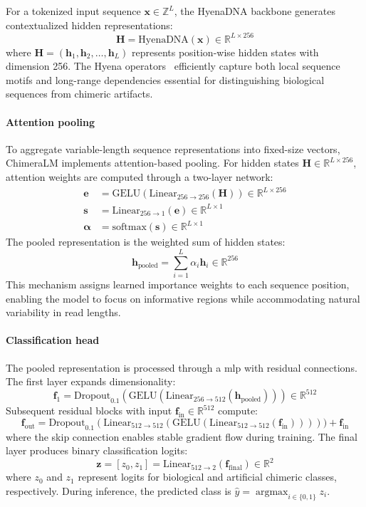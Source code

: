 \documentclass[pdflatex,sn-nature,lineno]{sn-jnl}%
\DeclareMathOperator*{\argmax}{argmax}
\theoremstyle{thmstyleone}%
\theoremstyle{thmstyletwo}%
\theoremstyle{thmstylethree}%
\begin{document}
For a tokenized input sequence $\mathbf{x} \in \mathbb{Z}^{L}$, the HyenaDNA backbone generates contextualized hidden representations:
\[
\mathbf{H} = \text{HyenaDNA}(\mathbf{x}) \in \mathbb{R}^{L \times 256}
\]
where $\mathbf{H} = (\mathbf{h}_1, \mathbf{h}_2, \ldots, \mathbf{h}_L)$ represents position-wise hidden states with dimension 256. 
The Hyena operators~\cite{Poli2023HyenaHT} efficiently capture both local sequence motifs and long-range dependencies essential for distinguishing biological sequences from chimeric artifacts.

\paragraph{Attention pooling}
To aggregate variable-length sequence representations into fixed-size vectors, ChimeraLM implements attention-based pooling. 
For hidden states $\mathbf{H} \in \mathbb{R}^{L \times 256}$, attention weights are computed through a two-layer network:
\begin{align*}
\mathbf{e} &= \text{GELU}(\text{Linear}_{256 \to 256}(\mathbf{H})) \in \mathbb{R}^{L \times 256} \\
\mathbf{s} &= \text{Linear}_{256 \to 1}(\mathbf{e}) \in \mathbb{R}^{L \times 1} \\
\boldsymbol{\alpha} &= \text{softmax}(\mathbf{s}) \in \mathbb{R}^{L \times 1}
\end{align*}
The pooled representation is the weighted sum of hidden states:
\[
\mathbf{h}_{\text{pooled}} = \sum_{i=1}^{L} \alpha_i \mathbf{h}_i \in \mathbb{R}^{256}
\]
This mechanism assigns learned importance weights to each sequence position, enabling the model to focus on informative regions while accommodating natural variability in read lengths.

\paragraph{Classification head}
The pooled representation is processed through a \gls{mlp} with residual connections.
The first layer expands dimensionality:
\[
\mathbf{f}_1 = \text{Dropout}_{0.1}(\text{GELU}(\text{Linear}_{256 \to 512}(\mathbf{h}_{\text{pooled}}))) \in \mathbb{R}^{512}
\]
Subsequent residual blocks with input $\mathbf{f}_{\text{in}} \in \mathbb{R}^{512}$ compute:
\[
\mathbf{f}_{\text{out}} = \text{Dropout}_{0.1}(\text{Linear}_{512 \to 512}(\text{GELU}(\text{Linear}_{512 \to 512}(\mathbf{f}_{\text{in}}))))) + \mathbf{f}_{\text{in}}
\]
where the skip connection enables stable gradient flow during training.
The final layer produces binary classification logits:
\[
\mathbf{z} = [z_0, z_1] = \text{Linear}_{512 \to 2}(\mathbf{f}_{\text{final}}) \in \mathbb{R}^{2}
\]
where $z_0$ and $z_1$ represent logits for biological and artificial chimeric classes, respectively. During inference, the predicted class is $\hat{y} = \argmax_{i \in \{0,1\}} z_i$.
\end{document}

